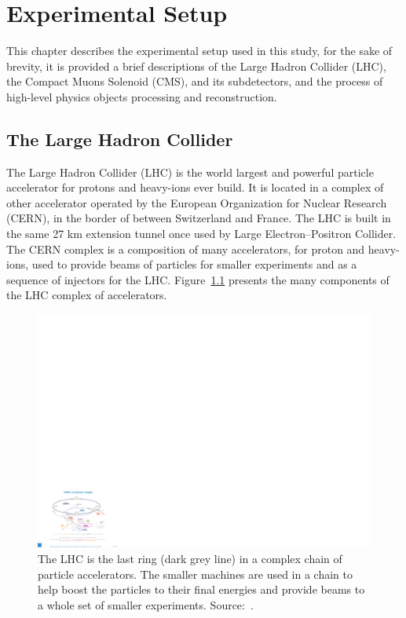 
\chapter{Experimental Setup}

This chapter describes the experimental setup used in this study, for the sake of brevity, it is provided a brief descriptions of the Large Hadron Collider (LHC), the Compact Muons Solenoid (CMS), and its subdetectors, and the process of high-level physics objects processing and reconstruction.

\section{The Large Hadron Collider}

The Large Hadron Collider (LHC) is the world largest and powerful particle accelerator for protons and heavy-ions ever build. It is located in a complex of other accelerator operated by the European Organization for Nuclear Research (CERN), in the border of between Switzerland and France. The LHC is built in the same 27 km extension tunnel once used by Large Electron–Positron Collider. The CERN complex is a composition of many accelerators, for proton and heavy-ions, used to provide beams of particles for smaller experiments and as a sequence of injectors for the LHC. Figure~\ref{lhc_complex} presents the many components of the LHC complex of accelerators.

\begin{figure}[htbp]
    \centering
    \includegraphics[width=\textwidth]{figures_and_tables/experimental_setup/lhc_complex.pdf}
    \caption{The LHC is the last ring (dark grey line) in a complex chain of particle accelerators. The smaller machines are used in a chain to help boost the particles to their final energies and provide beams to a whole set of smaller experiments. Source:~\cite{lhc_complex}.}
    \label{lhc_complex}
  \end{figure}